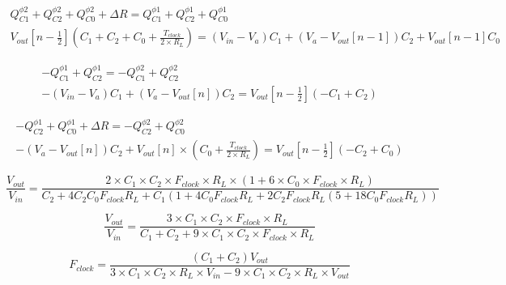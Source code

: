 \documentclass[12pt]{article}
\begin{document}
{	%
	
	{\footnotesize
	\begin{equation}
	\begin{array}{cc}
		Q^{\phi 2}_{C1}+Q^{\phi 2}_{C2}+Q^{\phi 2}_{C0}+\Delta R = Q^{\phi 1}_{C1}+Q^{\phi 1}_{C2}+Q^{\phi 1}_{C0}\\ [1em]
		V_{out}[n-\frac{1}{2}](C_1+C_2+C_0+\frac{T_{clock}}{2\times R_L})=(V_{in}-V_a)C_1+(V_a-V_{out}[n-1])C_2+V_{out}[n-1]C_0
	\end{array}
	\end{equation} }
	
	{\footnotesize	
	\begin{equation}
	\begin{array}{cc}
		-Q^{\phi 1}_{C1}+Q^{\phi 1}_{C2}=-Q^{\phi 2}_{C1}+Q^{\phi 2}_{C2}\\ [1em]
		-(V_{in}-V_a)C_1+(V_a-V_{out}[n])C_2=V_{out}[n-\frac{1}{2}](-C_1+C_2)
	\end{array}
	\end{equation} }
	
	{\footnotesize	
	\begin{equation}
	\begin{array}{cc}
		-Q^{\phi 1}_{C2}+Q^{\phi 1}_{C0}+\Delta R=-Q^{\phi 2}_{C2}+Q^{\phi 2}_{C0}\\ [1em]
		-(V_{a}-V_{out}[n])C_2+V_{out}[n]\times (C_0+\frac{T_{clock}}{2\times R_L})=V_{out}[n-\frac{1}{2}](-C_2+C_0)
	\end{array}
	\end{equation} }
	
	{\footnotesize	
	\begin{equation}
		\frac{V_{out}}{V_{in}}=\frac{2\times C_1\times C_2\times F_{clock}\times R_L\times (1+6\times C_0\times F_{clock}\times R_L)}{C_2+4C_2C_0F_{clock}R_L+C_1(1+4C_0F_{clock}R_L+2C_2F_{clock}R_L(5+18C_0F_{clock}R_L))}
	\end{equation}
	
	{\footnotesize
	\begin{equation}
		\frac{V_{out}}{V_{in}}=\frac{3\times C_1\times C_2\times F_{clock}\times R_L}{C_1+C_2+9\times C_1\times C_2\times F_{clock}\times R_L}
	\end{equation} }
	
	{\footnotesize
	\begin{equation}
		F_{clock}=\frac{(C_1+C_2)V_{out}}{3\times C_1\times C_2\times R_L\times V_{in}-9\times C_1\times C_2\times R_L\times V_{out}}
	\end{equation} }
	
}}
\end{document}
